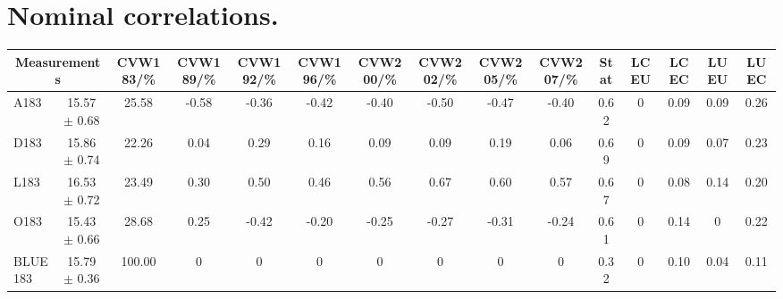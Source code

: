 \section{Nominal correlations.}
\begin{table}[H]
\scriptsize
\begin{center}
\renewcommand{\arraystretch}{1.1}
\begin{tabular}{|lc|c|c|c|c|c|c|c|c|ccccc|}
\hline
\multicolumn{2}{|c|}{Measurements} & CVW{\tiny 183}/\%  & CVW{\tiny 189}/\%  & CVW{\tiny 192}/\%  & CVW{\tiny 196}/\%  & CVW{\tiny 200}/\%  & CVW{\tiny 202}/\%  & CVW{\tiny 205}/\%  & CVW{\tiny 207}/\%  & {\tiny Stat} & {\tiny LCEU} & {\tiny LCEC} & {\tiny LUEU} & {\tiny LUEC}\\
\hline
A183 &      15.57 $\pm$       0.68 &      25.58 &      -0.58 &      -0.36 &      -0.42 &      -0.40 &      -0.50 &      -0.47 &      -0.40 &       0.62 &  0 &       0.09 &       0.09 &       0.26\\
D183 &      15.86 $\pm$       0.74 &      22.26 &       0.04 &       0.29 &       0.16 &       0.09 &       0.09 &       0.19 &       0.06 &       0.69 &  0 &       0.09 &       0.07 &       0.23\\
L183 &      16.53 $\pm$       0.72 &      23.49 &       0.30 &       0.50 &       0.46 &       0.56 &       0.67 &       0.60 &       0.57 &       0.67 &  0 &       0.08 &       0.14 &       0.20\\
O183 &      15.43 $\pm$       0.66 &      28.68 &       0.25 &      -0.42 &      -0.20 &      -0.25 &      -0.27 &      -0.31 &      -0.24 &       0.61 &  0 &       0.14 &  0 &       0.22\\
\hline
BLUE {\tiny 183} &      15.79 $\pm$       0.36 &     100.00 &  0 &  0 &  0 &  0 &  0 &  0 &  0 &       0.32 &  0 &       0.10 &       0.04 &       0.11\\
\hline
\end{tabular}
\renewcommand{\arraystretch}{1}
\end{center}
\end{table}
\vspace*{-0.5cm}
